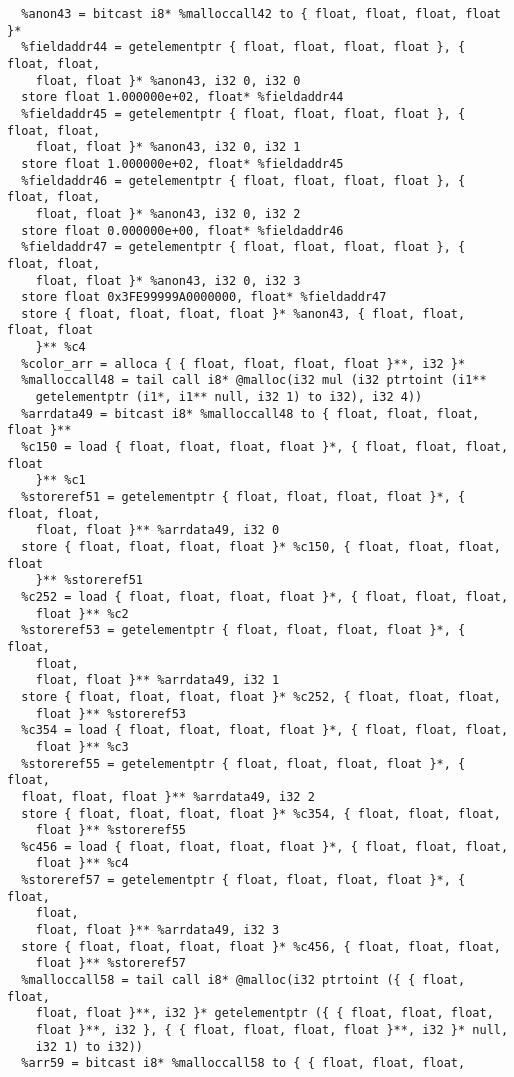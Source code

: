 \documentclass[main.tex]{subfiles}
\begin{document}
{\begin{lstlisting}
  %anon43 = bitcast i8* %malloccall42 to { float, float, float, float }*
  %fieldaddr44 = getelementptr { float, float, float, float }, { float, float,
    float, float }* %anon43, i32 0, i32 0
  store float 1.000000e+02, float* %fieldaddr44
  %fieldaddr45 = getelementptr { float, float, float, float }, { float, float, 
    float, float }* %anon43, i32 0, i32 1
  store float 1.000000e+02, float* %fieldaddr45
  %fieldaddr46 = getelementptr { float, float, float, float }, { float, float, 
    float, float }* %anon43, i32 0, i32 2
  store float 0.000000e+00, float* %fieldaddr46
  %fieldaddr47 = getelementptr { float, float, float, float }, { float, float, 
    float, float }* %anon43, i32 0, i32 3
  store float 0x3FE99999A0000000, float* %fieldaddr47
  store { float, float, float, float }* %anon43, { float, float, float, float
    }** %c4
  %color_arr = alloca { { float, float, float, float }**, i32 }*
  %malloccall48 = tail call i8* @malloc(i32 mul (i32 ptrtoint (i1** 
    getelementptr (i1*, i1** null, i32 1) to i32), i32 4))
  %arrdata49 = bitcast i8* %malloccall48 to { float, float, float, float }**
  %c150 = load { float, float, float, float }*, { float, float, float, float
    }** %c1
  %storeref51 = getelementptr { float, float, float, float }*, { float, float, 
    float, float }** %arrdata49, i32 0
  store { float, float, float, float }* %c150, { float, float, float, float
    }** %storeref51
  %c252 = load { float, float, float, float }*, { float, float, float, 
    float }** %c2
  %storeref53 = getelementptr { float, float, float, float }*, { float,
    float, 
    float, float }** %arrdata49, i32 1
  store { float, float, float, float }* %c252, { float, float, float,
    float }** %storeref53
  %c354 = load { float, float, float, float }*, { float, float, float,
    float }** %c3
  %storeref55 = getelementptr { float, float, float, float }*, { float,
  float, float, float }** %arrdata49, i32 2
  store { float, float, float, float }* %c354, { float, float, float,
    float }** %storeref55
  %c456 = load { float, float, float, float }*, { float, float, float,
    float }** %c4
  %storeref57 = getelementptr { float, float, float, float }*, { float,
    float, 
    float, float }** %arrdata49, i32 3
  store { float, float, float, float }* %c456, { float, float, float,
    float }** %storeref57
  %malloccall58 = tail call i8* @malloc(i32 ptrtoint ({ { float, float, 
    float, float }**, i32 }* getelementptr ({ { float, float, float,
    float }**, i32 }, { { float, float, float, float }**, i32 }* null,
    i32 1) to i32))
  %arr59 = bitcast i8* %malloccall58 to { { float, float, float, 

\end{lstlisting}}
\end{document}
